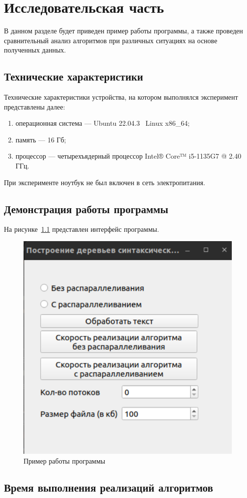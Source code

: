 \chapter{Исследовательская часть}

В данном разделе будет приведен пример работы программы, а также проведен сравнительный анализ алгоритмов при различных ситуациях на основе полученных данных.

\section{Технические характеристики}

Технические характеристики устройства, на котором выполнялся эксперимент представлены далее:

\begin{enumerate}[label=\arabic*)]
	\item операционная система --- Ubuntu 22.04.3~\cite{ubuntu} Linux x86\_64;
	\item память --- 16 Гб;
	\item процессор --- четырехъядерный процессор Intel® Core™ i5-1135G7 @ 2.40 ГГц.
\end{enumerate}

При эксперименте ноутбук не был включен в сеть электропитания.

\section{Демонстрация работы программы}

На рисунке~\ref{fig:example} представлен интерфейс программы.

\begin{figure}[h!]
	\centering
	\includegraphics[width=0.4\linewidth]{img/example}
	\caption{Пример работы программы}
	\label{fig:example}
\end{figure}

\section{Время выполнения реализаций алгоритмов}

